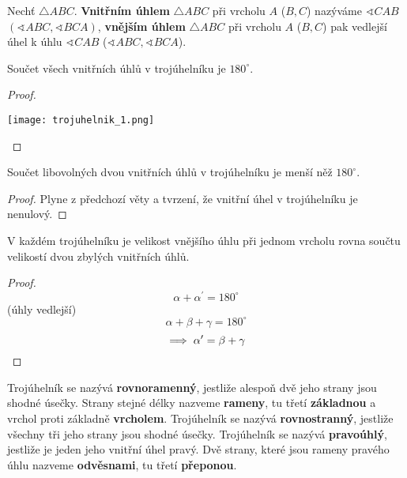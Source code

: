 \begin{definition}
  Nechť $\triangle ABC$. \textbf{Vnitřním úhlem} $\triangle ABC$ při vrcholu $A$ ($B, C$) nazýváme $\sphericalangle CAB$ $(\sphericalangle ABC, \sphericalangle BCA)$, \textbf{vnějším úhlem} $\triangle ABC$ při vrcholu $A$ ($B, C$) pak vedlejší úhel k úhlu $\sphericalangle CAB$ ($\sphericalangle ABC, \sphericalangle BCA$).
\end{definition}

\begin{veta}
  Součet všech vnitřních úhlů v trojúhelníku je $180^\circ$.
\end{veta}

\begin{proof}
  $ $ \newline
  \begin{center}
   \texttt{[image: trojuhelnik\_1.png]}
  \end{center}
\end{proof}

\begin{veta}
  Součet libovolných dvou vnitřních úhlů v trojúhelníku je menší něž $180^\circ$.
\end{veta}

\begin{proof}
  Plyne z předchozí věty a tvrzení, že vnitřní úhel v trojúhelníku je nenulový.
\end{proof}

\begin{veta}
  V každém trojúhelníku je velikost vnějšího úhlu při jednom vrcholu rovna součtu velikostí dvou zbylých vnitřních úhlů.
\end{veta}

\begin{proof}
  $$\alpha + \alpha^\prime = 180^\circ$$ (úhly vedlejší)
  $$\alpha + \beta + \gamma = 180^\circ$$
  $$\implies \alpha^\prime = \beta + \gamma\qedhere$$
\end{proof}

\begin{definition}
  Trojúhelník se nazývá \textbf{rovnoramenný}, jestliže alespoň dvě jeho strany jsou shodné úsečky. Strany stejné délky nazveme \textbf{rameny}, tu třetí \textbf{základnou} a vrchol proti základně \textbf{vrcholem}.
  Trojúhelník se nazývá \textbf{rovnostranný}, jestliže všechny tři jeho strany jsou shodné úsečky.
  Trojúhelník se nazývá \textbf{pravoúhlý}, jestliže je jeden jeho vnitřní úhel pravý. Dvě strany, které jsou rameny pravého úhlu nazveme \textbf{odvěsnami}, tu třetí \textbf{přeponou}.
\end{definition}

